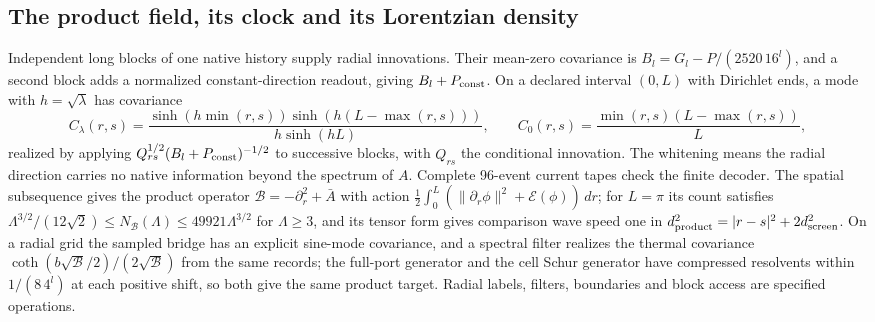 \documentclass[11pt]{article}
\theoremstyle{definition}
\theoremstyle{remark}
\theoremstyle{plain}
\begin{document}
\subsection{The product field, its clock and its Lorentzian density}
\label{sec:product-field}

Independent long blocks of one native history supply radial innovations.
Their mean-zero covariance is $B_l=G_l-P/(2520\,16^l)$, and a second block
adds a normalized constant-direction readout, giving $B_l+P_{\rm const}$. On
a declared interval $(0,L)$ with Dirichlet ends, a mode with $h=\sqrt\lambda$
has covariance
\[
 C_\lambda(r,s)=
 \frac{\sinh(h\min(r,s))\sinh(h(L-\max(r,s)))}{h\sinh(hL)},
 \qquad C_0(r,s)=\frac{\min(r,s)(L-\max(r,s))}{L},
\]
realized by applying $Q_{rs}^{1/2}(B_l+P_{\rm const})^{-1/2}$ to successive
blocks, with $Q_{rs}$ the conditional innovation. The whitening means the
radial direction carries no native information beyond the spectrum of $A$.
Complete 96-event current tapes check the finite decoder. The spatial
subsequence gives the product operator $\mathcal B=-\partial_r^2+\bar A$ with
action $\frac12\int_0^L(\|\partial_r\phi\|^2+\mathcal E(\phi))\,dr$; for
$L=\pi$ its count satisfies
$\Lambda^{3/2}/(12\sqrt2)\le N_{\mathcal B}(\Lambda)\le49921\Lambda^{3/2}$
for $\Lambda\ge3$, and its tensor form gives comparison wave speed one in
$d_{\rm product}^2=|r-s|^2+2d_{\rm screen}^2$. On a radial grid the sampled
bridge has an explicit sine-mode covariance, and a spectral filter realizes
the thermal covariance $\coth(b\sqrt{\mathcal B}/2)/(2\sqrt{\mathcal B})$
from the same records; the full-port generator and the cell Schur generator
have compressed resolvents within $1/(8\,4^l)$ at each positive shift, so
both give the same product target. Radial labels, filters, boundaries and
block access are specified operations.
\end{document}
